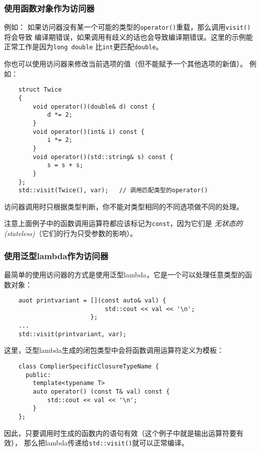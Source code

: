 \subsubsection*{使用函数对象作为访问器}
例如：
如果访问器没有某一个可能的类型的\texttt{operator()}重载，那么调用\texttt{visit()}将会导致
编译期错误，如果调用有歧义的话也会导致编译期错误。这里的示例能正常工作是因为\texttt{long double}
比\texttt{int}更匹配\texttt{double}。

你也可以使用访问器来修改当前选项的值（但不能赋予一个其他选项的新值）。
例如：
\begin{lstlisting}
    struct Twice
    {
        void operator()(double& d) const {
            d *= 2;
        }
        void operator()(int& i) const {
            i *= 2;
        }
        void operator()(std::string& s) const {
            s = s + s;
        }
    };
    std::visit(Twice(), var);   // 调用匹配类型的operator()
\end{lstlisting}
访问器调用时只根据类型判断，你不能对类型相同的不同选项做不同的处理。

注意上面例子中的函数调用运算符都应该标记为\texttt{const}，因为它们是
\emph{无状态的(stateless)}（它们的行为只受参数的影响）。

\subsubsection*{使用泛型lambda作为访问器}\label{ch16.3.3.2}
最简单的使用访问器的方式是使用泛型lambda，它是一个可以处理任意类型的函数对象：
\begin{lstlisting}
    auot printvariant = [](const auto& val) {
                            std::cout << val << '\n';
                        };
    ...
    std::visit(printvariant, var);
\end{lstlisting}
这里，泛型lambda生成的闭包类型中会将函数调用运算符定义为模板：
\begin{lstlisting}
    class ComplierSpecificClosureTypeName {
      public:
        template<typename T>
        auto operator() (const T& val) const {
            std::cout << val << '\n';
        }
    };
\end{lstlisting}
因此，只要调用时生成的函数内的语句有效（这个例子中就是输出运算符要有效），
那么把lambda传递给\texttt{std::visit()}就可以正常编译。

